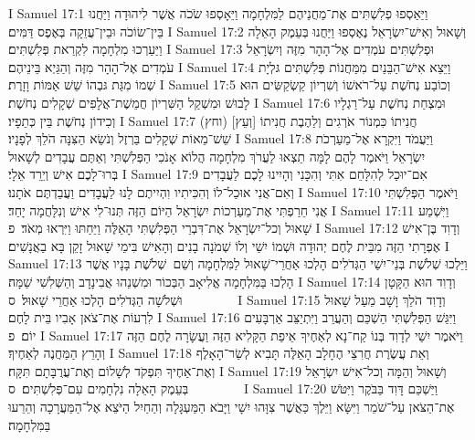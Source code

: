 I Samuel 17:1	וַיַּאַסְפוּ פְלִשְׁתִּים אֶת־מַחֲנֵיהֶם לַמִּלְחָמָה וַיֵּאָסְפוּ שֹׂכֹה אֲשֶׁר לִיהוּדָה וַיַּחֲנוּ בֵּין־שׂוֹכֹה וּבֵין־עֲזֵקָה בְּאֶפֶס דַּמִּים׃
I Samuel 17:2	וְשָׁאוּל וְאִישׁ־יִשְׂרָאֵל נֶאֶסְפוּ וַיַּחֲנוּ בְּעֵמֶק הָאֵלָה וַיַּעַרְכוּ מִלְחָמָה לִקְרַאת פְּלִשְׁתִּים׃
I Samuel 17:3	וּפְלִשְׁתִּים עֹמְדִים אֶל־הָהָר מִזֶּה וְיִשְׂרָאֵל עֹמְדִים אֶל־הָהָר מִזֶּה וְהַגַּיְא בֵּינֵיהֶם׃
I Samuel 17:4	וַיֵּצֵא אִישׁ־הַבֵּנַיִם מִמַּחֲנוֹת פְּלִשְׁתִּים גּלְיָת שְׁמוֹ מִגַּת גּבְהוֹ שֵׁשׁ אַמּוֹת וָזָרֶת׃
I Samuel 17:5	וְכוֹבַע נְחֹשֶׁת עַל־רֹאשׁוֹ וְשִׁרְיוֹן קַשְׂקַשִּׂים הוּא לָבוּשׁ וּמִשְׁקַל הַשִּׁרְיוֹן חֲמֵשֶׁת־אֲלָפִים שְׁקָלִים נְחֹשֶׁת׃
I Samuel 17:6	וּמִצְחַת נְחֹשֶׁת עַל־רַגְלָיו וְכִידוֹן נְחֹשֶׁת בֵּין כְּתֵפָיו׃
I Samuel 17:7	(וחץ) [וְעֵץ] חֲנִיתוֹ כִּמְנוֹר אֹרְגִים וְלַהֶבֶת חֲנִיתוֹ שֵׁשׁ־מֵאוֹת שְׁקָלִים בַּרְזֶל וְנֹשֵׂא הַצִּנָּה הֹלֵךְ לְפָנָיו׃
I Samuel 17:8	וַיַּעֲמֹד וַיִּקְרָא אֶל־מַעַרְכֹת יִשְׂרָאֵל וַיֹּאמֶר לָהֶם לָמָּה תֵצְאוּ לַעֲרֹךְ מִלְחָמָה הֲלוֹא אָנֹכִי הַפְּלִשְׁתִּי וְאַתֶּם עֲבָדִים לְשָׁאוּל בְּרוּ־לָכֶם אִישׁ וְיֵרֵד אֵלָי׃
I Samuel 17:9	אִם־יוּכַל לְהִלָּחֵם אִתִּי וְהִכָּנִי וְהָיִינוּ לָכֶם לַעֲבָדִים וְאִם־אֲנִי אוּכַל־לוֹ וְהִכִּיתִיו וִהְיִיתֶם לָנוּ לַעֲבָדִים וַעֲבַדְתֶּם אֹתָנוּ׃
I Samuel 17:10	וַיֹּאמֶר הַפְּלִשְׁתִּי אֲנִי חֵרַפְתִּי אֶת־מַעַרְכוֹת יִשְׂרָאֵל הַיּוֹם הַזֶּה תְּנוּ־לִי אִישׁ וְנִלָּחֲמָה יָחַד׃
I Samuel 17:11	וַיִּשְׁמַע שָׁאוּל וְכל־יִשְׂרָאֵל אֶת־דִּבְרֵי הַפְּלִשְׁתִּי הָאֵלֶּה וַיֵּחַתּוּ וַיִּרְאוּ מְאֹד׃ {פ}
I Samuel 17:12	וְדָוִד בֶּן־אִישׁ אֶפְרָתִי הַזֶּה מִבֵּית לֶחֶם יְהוּדָה וּשְׁמוֹ יִשַׁי וְלוֹ שְׁמֹנָה בָנִים וְהָאִישׁ בִּימֵי שָׁאוּל זָקֵן בָּא בַאֲנָשִׁים׃
I Samuel 17:13	וַיֵּלְכוּ שְׁלֹשֶׁת בְּנֵי־יִשַׁי הַגְּדֹלִים הָלְכוּ אַחֲרֵי־שָׁאוּל לַמִּלְחָמָה וְשֵׁם  שְׁלֹשֶׁת בָּנָיו אֲשֶׁר הָלְכוּ בַּמִּלְחָמָה אֱלִיאָב הַבְּכוֹר וּמִשְׁנֵהוּ אֲבִינָדָב וְהַשְּׁלִשִׁי שַׁמָּה׃
I Samuel 17:14	וְדָוִד הוּא הַקָּטָן וּשְׁלֹשָׁה הַגְּדֹלִים הָלְכוּ אַחֲרֵי שָׁאוּל׃ {ס}        
I Samuel 17:15	וְדָוִד הֹלֵךְ וָשָׁב מֵעַל שָׁאוּל לִרְעוֹת אֶת־צֹאן אָבִיו בֵּית לָחֶם׃
I Samuel 17:16	וַיִּגַּשׁ הַפְּלִשְׁתִּי הַשְׁכֵּם וְהַעֲרֵב וַיִּתְיַצֵּב אַרְבָּעִים יוֹם׃ {פ}
I Samuel 17:17	וַיֹּאמֶר יִשַׁי לְדָוִד בְּנוֹ קַח־נָא לְאַחֶיךָ אֵיפַת הַקָּלִיא הַזֶּה וַעֲשָׂרָה לֶחֶם הַזֶּה וְהָרֵץ הַמַּחֲנֶה לְאַחֶיךָ׃
I Samuel 17:18	וְאֵת עֲשֶׂרֶת חֲרִצֵי הֶחָלָב הָאֵלֶּה תָּבִיא לְשַׂר־הָאָלֶף וְאֶת־אַחֶיךָ תִּפְקֹד לְשָׁלוֹם וְאֶת־עֲרֻבָּתָם תִּקָּח׃
I Samuel 17:19	וְשָׁאוּל וְהֵמָּה וְכל־אִישׁ יִשְׂרָאֵל בְּעֵמֶק הָאֵלָה נִלְחָמִים עִם־פְּלִשְׁתִּים׃ {ס}        
I Samuel 17:20	וַיַּשְׁכֵּם דָּוִד בַּבֹּקֶר וַיִּטֹּשׁ אֶת־הַצֹּאן עַל־שֹׁמֵר וַיִּשָּׂא וַיֵּלֶךְ כַּאֲשֶׁר צִוָּהוּ יִשָׁי וַיָּבֹא הַמַּעְגָּלָה וְהַחַיִל הַיֹּצֵא אֶל־הַמַּעֲרָכָה וְהֵרֵעוּ בַּמִּלְחָמָה׃
